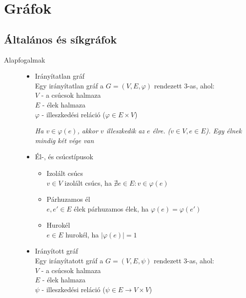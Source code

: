 \documentclass[margin=0px]{article}
\begin{document}
\section{Gráfok}
\subsection{Általános és síkgráfok}
\begin{description}
    \item[Alapfogalmak] \hfill
        \begin{itemize}
            \item Irányítatlan gráf\\
                  Egy irányítatlan gráf a $G = (V,E, \varphi)$ rendezett 3-as, ahol:\\
                  $V$ - a csúcsok halmaza \\
                  $E$ - élek halmaza \\
                  $\varphi$ - illeszkedési reláció ($\varphi \in E \times V$)

                  \textit{Ha $v\in\varphi(e)$, akkor $v$ illeszkedik az $e$ élre. ($v\in V, e\in E$). Egy élnek mindig két vége van}

            \item Él-, és csúcstípusok
                  \begin{itemize}
                      \item Izolált csúcs \\
                            $v\in V$ izolált csúcs, ha $\nexists e \in E: v\in \varphi(e)$
                      \item Párhuzamos él \\
                            $e,e'\in E$ élek párhuzamos élek, ha $\varphi(e) = \varphi(e')$
                      \item Hurokél \\
                            $e\in E$ hurokél, ha $|\varphi(e) | = 1$
                  \end{itemize}
            \item Irányított gráf \\
                  Egy irányítatott gráf a $G = (V,E, \psi)$ rendezett 3-as, ahol:\\
                  $V$ - a csúcsok halmaza \\
                  $E$ - élek halmaza \\
                  $\psi$ - illeszkedési reláció ($\psi \in E \rightarrow V \times V$)


\end{itemize}
\end{description}
\end{document}
